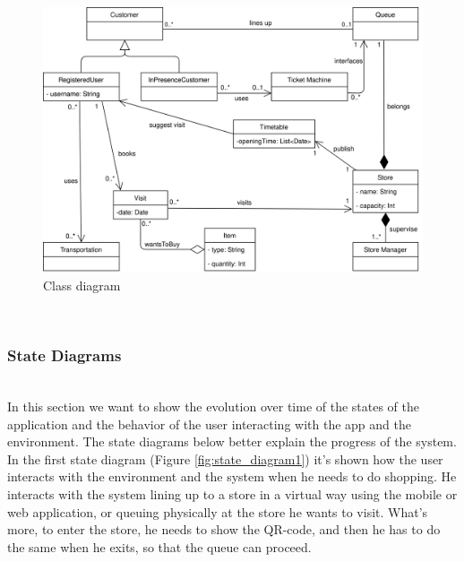 \documentclass[]{article}
\begin{document}
		\begin{figure}[htp]
			\centering
			\includegraphics[scale=0.89]{UML_class_diagram.png}
			\caption{Class diagram}
			\label{fig:class_diagram}
		\end{figure}
		
	\textbf{}\\
		\subsubsection{State Diagrams}
		
		\textbf{}\\
		In this section we want to show the evolution over time of the states of the application and the behavior of the user interacting with the app and the environment. 
The state diagrams below better explain the progress of the system.
		\newline
		\newline
		In the first state diagram (Figure \ref{fig:state_diagram1}) it’s shown how the user interacts with the environment and the system when he needs to do shopping. He interacts with the system lining up to a store in a virtual way using the mobile or web application, or queuing physically at the store he wants to visit.
		What’s more, to enter the store, he needs to show the QR-code, and then he has to do the same when he exits, so that the queue can proceed. \\
		
\end{document}
